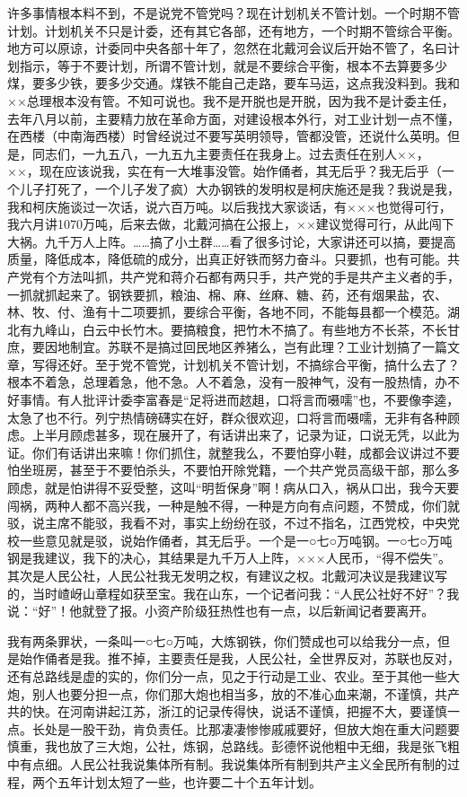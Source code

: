 许多事情根本料不到，不是说党不管党吗？现在计划机关不管计划。一个时期不管计划。计划机关不只是计委，还有其它各部，还有地方，一个时期不管综合平衡。地方可以原谅，计委同中央各部十年了，忽然在北戴河会议后开始不管了，名曰计划指示，等于不要计划，所谓不管计划，就是不要综合平衡，根本不去算要多少煤，要多少铁，要多少交通。煤铁不能自己走路，要车马运，这点我没料到。我和××总理根本没有管。不知可说也。我不是开脱也是开脱，因为我不是计委主任，去年八月以前，主要精力放在革命方面，对建设根本外行，对工业计划一点不懂，在西楼（中南海西楼）时曾经说过不要写英明领导，管都没管，还说什么英明。但是，同志们，一九五八，一九五九主要责任在我身上。过去责任在别人××，××，现在应该说我，实在有一大堆事没管。始作俑者，其无后乎？我无后乎（一个儿子打死了，一个儿子发了疯）大办钢铁的发明权是柯庆施还是我？我说是我，我和柯庆施谈过一次话，说六百万吨。以后我找大家谈话，有×××也觉得可行，我六月讲1070万吨，后来去做，北戴河搞在公报上，××建议觉得可行，从此闯下大祸。九千万人上阵。……搞了小土群……看了很多讨论，大家讲还可以搞，要提高质量，降低成本，降低硫的成分，出真正好铁而努力奋斗。只要抓，也有可能。共产党有个方法叫抓，共产党和蒋介石都有两只手，共产党的手是共产主义者的手，一抓就抓起来了。钢铁要抓，粮油、棉、麻、丝麻、糖、药，还有烟果盐，农、林、牧、付、渔有十二项要抓，要综合平衡，各地不同，不能每县都一个模范。湖北有九峰山，白云中长竹木。要搞粮食，把竹木不搞了。有些地方不长茶，不长甘庶，要因地制宜。苏联不是搞过回民地区养猪么，岂有此理？工业计划搞了一篇文章，写得还好。至于党不管党，计划机关不管计划，不搞综合平衡，搞什么去了？根本不着急，总理着急，他不急。人不着急，没有一股神气，没有一股热情，办不好事情。有人批评计委李富春是“足将进而趑趄，口将言而嗫嚅”也，不要像李逵，太急了也不行。列宁热情磅礴实在好，群众很欢迎，口将言而嗫嚅，无非有各种顾虑。上半月顾虑甚多，现在展开了，有话讲出来了，记录为证，口说无凭，以此为证。你们有话讲出来嘛！你们抓住，就整我么，不要怕穿小鞋，成都会议讲过不要怕坐班房，甚至于不要怕杀头，不要怕开除党籍，一个共产党员高级干部，那么多顾虑，就是怕讲得不妥受整，这叫“明哲保身”啊！病从口入，祸从口出，我今天要闯祸，两种人都不高兴我，一种是触不得，一种是方向有点问题，不赞成，你们就驳，说主席不能驳，我看不对，事实上纷纷在驳，不过不指名，江西党校，中央党校一些意见就是驳，说始作俑者，其无后乎。一个是一○七○万吨钢。一○七○万吨钢是我建议，我下的决心，其结果是九千万人上阵，×××人民币，“得不偿失”。其次是人民公社，人民公社我无发明之权，有建议之权。北戴河决议是我建议写的，当时嵖岈山章程如获至宝。我在山东，一个记者问我：“人民公社好不好”？我说：“好”！他就登了报。小资产阶级狂热性也有一点，以后新闻记者要离开。

我有两条罪状，一条叫一○七○万吨，大炼钢铁，你们赞成也可以给我分一点，但是始作俑者是我。推不掉，主要责任是我，人民公社，全世界反对，苏联也反对，还有总路线是虚的实的，你们分一点，见之于行动是工业、农业。至于其他一些大炮，别人也要分担一点，你们那大炮也相当多，放的不准心血来潮，不谨慎，共产共的快。在河南讲起江苏，浙江的记录传得快，说话不谨慎，把握不大，要谨慎一点。长处是一股干劲，肯负责任。比那凄凄惨惨戚戚要好，但放大炮在重大问题要慎重，我也放了三大炮，公社，炼钢，总路线。彭德怀说他粗中无细，我是张飞粗中有点细。人民公社我说集体所有制。我说集体所有制到共产主义全民所有制的过程，两个五年计划太短了一些，也许要二十个五年计划。

